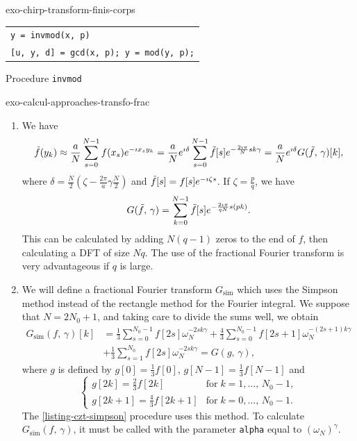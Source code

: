 \begin{correction}{exo-chirp-transform-finis-corps}
\begin{listing} \begin{footnotesize}
{\upshape
\begin{tabular}{l} \texttt{\pfunction y = invmod(x, p)} \\
\texttt{[u, y, d] = gcd(x, p); y = mod(y, p);} \\
\end{tabular}
}
 \end{footnotesize}
\caption{Procedure \texttt{\upshape invmod}}
\label{listing-invmod}
\end{listing}
\end{correction}
 
 
\begin{correction}{exo-calcul-approaches-transfo-frac}
\begin{enumerate}
\item We have
\begin{equation*}
\hat{f} (y_k) \approx \frac{a}{N} \sum_{s = 0}^{N-1}{f(x_s) e^{- \imath x_s y_k}} = \frac{a}{N} e^{\imath \delta} \sum_{s = 0}^{N-1}{\tilde{f}[s] e^{- \frac{2 \imath \pi}{N} sk \gamma}} = \frac{a}{N} e^{\imath \delta} G (\tilde{f}, \, \gamma) [k],
\end{equation*}
where $ \delta = \frac{N}{2} \left(\zeta - \frac{2 \pi}{a} \gamma \frac{N}{2} \right) $ and $ \tilde{f}[s] = f [s] e^{- \imath \zeta s} $. If $ \zeta = \frac{p}{q} $, we have
\begin{equation*}
G (\tilde{f}, \, \gamma) = \sum_{k = 0}^{N-1}{\tilde{f}[s] e^{- \frac{2 \imath \pi}{q N} s (pk)}}.
\end{equation*}
This can be calculated by adding $ N (q-1) $ zeros to the end of $ f $, then calculating a DFT of size $ N q $. The use of the fractional Fourier transform is very advantageous if $ q $ is large.
\item We will define a fractional Fourier transform $ G_{\text{sim}} $ which uses the Simpson method instead of the rectangle method for the Fourier integral. We suppose that $ N = 2 N_0+1 $, and taking care to divide the sums well, we obtain
\begin{align*}
G_{\text{sim}} (f, \, \gamma) [k] & = \frac{1}{3} \sum_{s = 0}^{N_0-1}{f [2s] \omega_N^{-2 sk \gamma}} + \frac{4}{3} \sum_{s = 0}^{N_0-1}{f [2s+1] \omega_N^{- (2s+1) k \gamma}} \\
& + \frac{1}{3} \sum_{s = 1}^{N_0}{f [2s] \omega_N^{- 2 sk \gamma}} = G (g, \, \gamma),
\end{align*}
where $ g $ is defined by $ g [0] = \frac{1}{3} f [0] $, $ g [N-1] = \frac{1}{3} f [N-1] $ and
\begin{equation*}
\left\{\begin{array}{ll} g [2k] = \frac{2}{3} f [2k] & \text{for} \; k = 1, \ldots, \, N_0-1, \\g [2k+1] = \frac{4}{3} f [2k+1] & \text{for} \; k = 0, \ldots, \, N_0-1. \end{array} \right.
\end{equation*}
The \Matlab{} \ref{listing-czt-simpson} procedure uses this method. To calculate $ G_{\text{sim}} (f, \, \gamma) $, it must be called with the parameter \texttt{alpha} equal to $ (\omega_N)^{\gamma} $.


\end{enumerate}
\end{correction}
